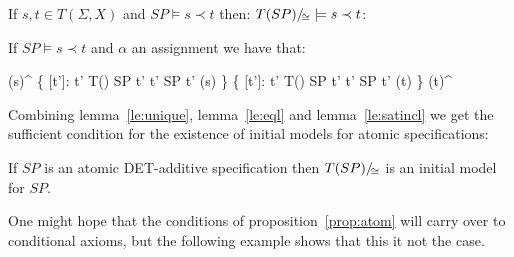 \documentclass[10pt]{article}
\begin{document}
\begin{lemma}
\label{le:satincl}
If $s,t \in T(\Sigma,X)$ and $SP \models s \prec t$ then: ${T(SP)/\!_{\cong}} \models s \prec t$:
\end{lemma}
%
\begin{PROOF}
If $SP\models s \prec t$ and $\alpha$ an assignment we have that:
	\begin{eqp}
		\alpha(s)^{}
		\{ [t']: t' \in T(\Sigma) \land SP \models t' \eleq t' \land SP \models t' \prec \alpha(s) \}
		\{ [t']: t' \in T(\Sigma) \land SP \models t' \eleq t' \land SP \models t' \prec \alpha(t) \}
		\alpha(t)^{}
	\end{eqp}
\end{PROOF}
%
Combining lemma~\ref{le:unique}, lemma~\ref{le:eql} and
lemma~\ref{le:satincl} we get the sufficient condition for the existence of
initial models for atomic specifications:

\begin{proposition}\label{prop:atom} \cite{hussmann}
\label{fa:atinit}
If $SP$ is an atomic DET-additive specification then ${T(SP)/\!_{\cong}}$ is
an initial model for $SP$.
\end{proposition}
One might hope that the conditions of proposition~\ref{prop:atom} will carry over to conditional axioms,
but the following example shows that this it not the case.
\end{document}
